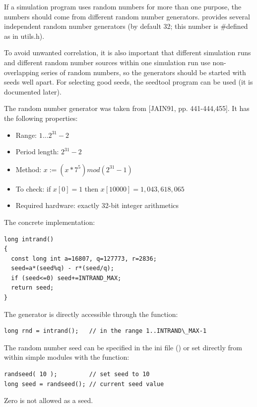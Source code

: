 If a simulation program uses random numbers for more than one purpose,
the numbers should come from different random number generators.
{\opp} provides several independent random number generators (by
default 32; this number is \#defined as
 in utils.h).


To avoid unwanted correlation, it is also important that different
simulation runs and different random number sources within one
simulation run use non-overlapping series of random numbers,
so the generators should be started with seeds well apart. For
selecting good seeds, the seedtool program can be used (it is
documented later).

The random number generator was taken from [JAIN91, pp. 441-444,455].
It has the following properties:
\begin{itemize}
\item{Range: $1... 2^{31}-2$}
\item{Period length: $2^{31}-2$}
\item{Method: $x := (x * 7^{5}) mod (2^{31}-1)$}
\item{To check: if $x[0]=1$ then $x[10000]=1,043,618,065$}
\item{Required hardware: exactly 32-bit integer arithmetics}
\end{itemize}

The concrete implementation:

\begin{verbatim}
long intrand()
{
  const long int a=16807, q=127773, r=2836;
  seed=a*(seed%q) - r*(seed/q);
  if (seed<=0) seed+=INTRAND_MAX;
  return seed;
}
\end{verbatim}


The generator is directly accessible through the  function:

\begin{verbatim}
long rnd = intrand();   // in the range 1..INTRAND\_MAX-1
\end{verbatim}

The random number seed can be specified in the ini file
() or set directly from within
simple modules with the 
function:

\begin{verbatim}
randseed( 10 );         // set seed to 10
long seed = randseed(); // current seed value
\end{verbatim}


Zero is not allowed as a seed.


